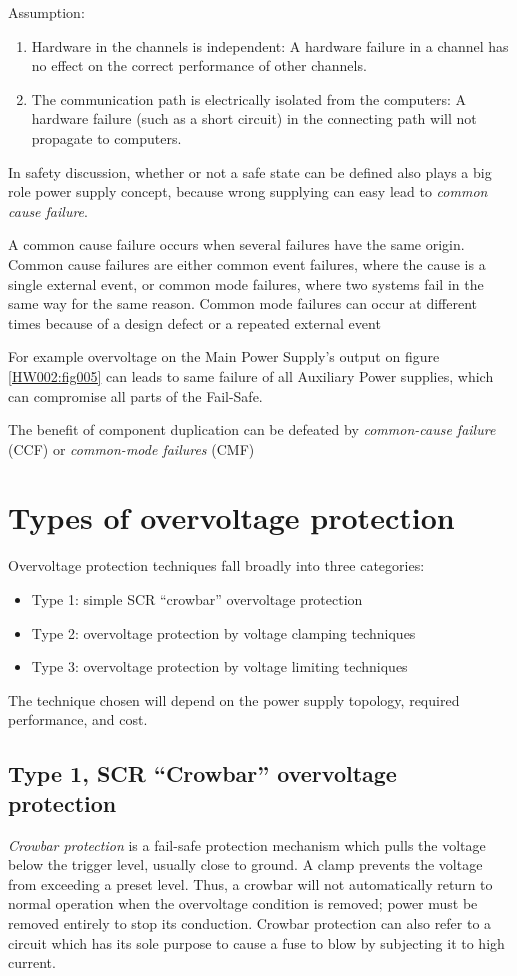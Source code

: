 \documentclass[journal]{IEEEtran}
\begin{document}
  Assumption:
  \begin{enumerate}[noitemsep]
    \item Hardware in the channels is independent: A hardware failure in a channel has no effect 
          on the correct performance of other channels.
    \item The communication path is electrically isolated from the computers: A hardware failure 
          (such as a short circuit) in the connecting path will not propagate to computers.
   \end{enumerate}
   
  In safety discussion, whether or not a safe state can be defined also plays a big role power 
  supply concept, because wrong supplying can easy lead to \emph{common cause failure}.
  
  A common cause failure occurs when several failures have the same origin. Common cause failures 
  are either common event failures, where the cause is a single external event, or common mode 
  failures, where two systems fail in the same way for the same reason. Common mode failures can 
  occur at different times because of a design defect or a repeated external event
  
  For example overvoltage on the Main Power Supply's output on figure \ref{HW002:fig005} can leads 
  to same failure of all Auxiliary Power supplies, which can compromise all parts of the Fail-Safe. 
  
  The benefit of component duplication can be defeated by \emph{common-cause failure} (CCF) or 
  \emph{common-mode failures} (CMF)

\section{Types of overvoltage protection}
  Overvoltage protection techniques fall broadly into three categories:
  \begin{itemize}
   \item Type 1: simple SCR “crowbar” overvoltage protection
   \item Type 2: overvoltage protection by voltage clamping techniques
   \item Type 3: overvoltage protection by voltage limiting techniques
  \end{itemize}

  The technique chosen will depend on the power supply topology, required performance, and cost.
  
  \subsection{Type 1, SCR “Crowbar” overvoltage protection}
    \emph{Crowbar protection} is a fail-safe protection mechanism which pulls the voltage below 
    the trigger level, usually close to ground. A clamp prevents the voltage from exceeding a 
    preset level. Thus, a crowbar will not automatically return to normal operation when the 
    overvoltage condition is removed; power must be removed entirely to stop its conduction. 
    Crowbar protection can also refer to a circuit which has its sole purpose to cause a fuse to 
    blow by subjecting it to high current.
  
\end{document}
